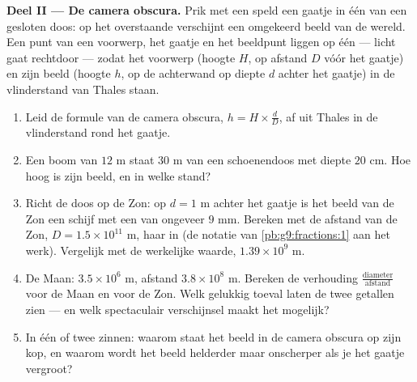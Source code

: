 \begin{problem}
\medskip
\noindent\textbf{Deel II --- De camera obscura.}
Prik met een speld een gaatje in één  van een gesloten doos: op het
overstaande  verschijnt een omgekeerd beeld van de wereld. Een punt van een
voorwerp, het gaatje en het beeldpunt liggen op één  --- licht gaat rechtdoor
--- zodat het voorwerp (hoogte $H$, op afstand $D$ vóór het gaatje) en zijn beeld
(hoogte $h$, op de achterwand op diepte $d$ achter het gaatje) in de vlinderstand
van Thales staan.
\begin{enumerate}[resume]
  \item Leid de formule van de camera obscura, $h = H \times \frac dD$, af uit
        Thales in de vlinderstand rond het gaatje.
  \item Een boom van $12$ m staat $30$ m van een schoenendoos met diepte $20$ cm.
        Hoe hoog is zijn beeld, en in welke stand?
  \item Richt de doos op de Zon: op $d = 1$ m achter het gaatje is het beeld van de
        Zon een schijf met een  van ongeveer $9$ mm. Bereken met de afstand
        van de Zon, $D = 1.5 \times 10^{11}$ m, haar  in  (de notatie van \cref{pb:g9:fractions:1} aan het werk). Vergelijk met
        de werkelijke waarde, $1.39 \times 10^9$ m.
  \item De Maan:  $3.5 \times 10^6$ m, afstand $3.8 \times 10^8$ m. Bereken
        de verhouding $\frac{\text{diameter}}{\text{afstand}}$ voor de Maan en voor
        de Zon. Welk gelukkig toeval laten de twee getallen zien --- en welk
        spectaculair verschijnsel maakt het mogelijk?
  \item In één of twee zinnen: waarom staat het beeld in de camera obscura op zijn
        kop, en waarom wordt het beeld helderder maar onscherper als je het gaatje
        vergroot?
\end{enumerate}


\end{problem}
